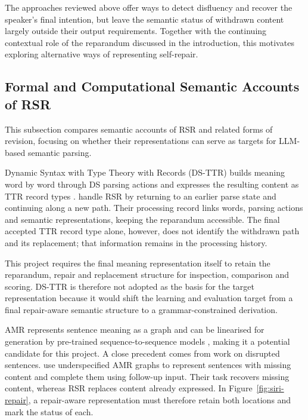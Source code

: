\documentclass{article}
\begin{document}
The approaches reviewed above offer ways to detect disfluency and recover
the speaker's final intention, but leave the semantic status of withdrawn
content largely outside their output requirements. Together with the
continuing contextual role of the reparandum discussed in the introduction,
this motivates exploring alternative ways of representing self-repair.

\subsection{Formal and Computational Semantic Accounts of RSR}
\label{sec:rw-representation-choice}

This subsection compares semantic accounts of RSR and related forms of
revision, focusing on whether their representations can serve as targets for
LLM-based semantic parsing.

Dynamic Syntax with Type Theory with Records (DS-TTR) builds meaning word by
word through DS parsing actions and expresses the resulting content as TTR
record types \citep{purverIncrementalSemanticConstruction2011}.
\citet{houghProcessingSelfrepairsIncremental2012} handle RSR by
returning to an earlier parse state and continuing along a new path.
Their processing record links words, parsing actions and semantic
representations, keeping the reparandum accessible. The final accepted TTR
record type alone, however, does not identify the withdrawn path and its
replacement; that information remains in the processing history.

This project requires the final meaning representation itself to retain the
reparandum, repair and replacement structure for inspection, comparison and
scoring. DS-TTR is therefore not adopted as the basis for the target
representation because it would shift the learning and evaluation target from
a final repair-aware semantic structure to a grammar-constrained derivation.

AMR represents sentence meaning as a graph
\citep{banarescuAbstractMeaningRepresentation2013} and can be linearised for
generation by pre-trained sequence-to-sequence models
\citep{fanLeveragingAMRGraph2024}, making it a potential candidate for this project. A
close precedent comes from work on disrupted sentences.
\citet{addleseeUnderstandingDisruptedSentences2023} use underspecified AMR
graphs to represent sentences with missing content and complete them using
follow-up input. Their task recovers missing content, whereas RSR replaces
content already expressed. In Figure~\ref{fig:siri-repair}, a repair-aware
representation must therefore retain both locations and mark the status of
each.
\end{document}

